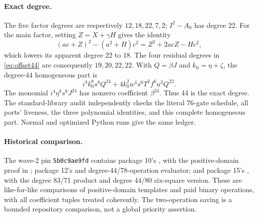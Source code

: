 \paragraph{Exact degree.}
The five factor degrees are respectively $12,18,22,7,2$; $I^2-A_0$ has
degree 22. For the main factor, setting $Z=X+\gamma H$ gives the identity
\[
(ac+Z)^2-(a^2+H)c^2=Z^2+2acZ-Hc^2,
\]
which lowers its apparent degree 22 to 18. The four residual degrees in
\eqref{eq:offset44} are consequently $19,20,22,22$. With
$Q=\beta J$ and $k_0=\eta+\zeta$, the degree-44 homogeneous part is
\[
i^4k_0^8s^8Q^{24}
 +4k_0^2w^4s^6T^2f^6u^2Q^{22}.
\]
The monomial $i^4\eta^8s^8J^{24}$ has nonzero coefficient $\beta^{24}$.
Thus 44 is the exact degree. The standard-library audit independently
checks the literal 76-gate schedule, all ports' liveness, the three
polynomial identities, and this complete homogeneous part. Normal and
optimized Python runs give the same ledger.

\paragraph{Historical comparison.}
The wave-2 pin \texttt{5b0c9ae9fd} contains package 10's
, with the positive-domain
proof in ; package 12's
 and degree-44/78-operation evaluator;
and package 15's , with the degree 83/71
product and degree 44/80 six-square version. These are like-for-like
comparisons of positive-domain templates and paid binary operations,
with all coefficient tuples treated coherently. The two-operation saving
is a bounded repository comparison, not a global priority assertion.
